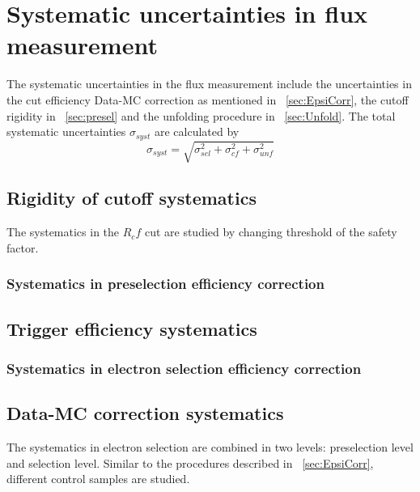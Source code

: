 \section{Systematic uncertainties in flux measurement}
The systematic uncertainties in the flux measurement include the uncertainties in the cut efficiency Data-MC correction as mentioned in ~\ref{sec:EpsiCorr}, the cutoff rigidity in ~\ref{sec:presel} and the unfolding procedure in ~\ref{sec:Unfold}. The total systematic uncertainties $\sigma_{syst}$ are calculated by
\begin{equation}
\sigma_{syst}=\sqrt{\sigma_{sel}^2+\sigma_{cf}^2+\sigma_{unf}^2}
\end{equation}

\subsection{Rigidity of cutoff systematics}
The systematics in the $R_cf$ cut are studied by changing threshold of the safety factor.

\subsubsection{Systematics in preselection efficiency correction}

\subsection{Trigger efficiency systematics}

\subsubsection{Systematics in electron selection efficiency correction}

\subsection{Data-MC correction systematics}
The systematics in electron selection are combined in two levels: preselection level and  selection level. Similar to the procedures described in ~\ref{sec:EpsiCorr}, different control samples are studied.


